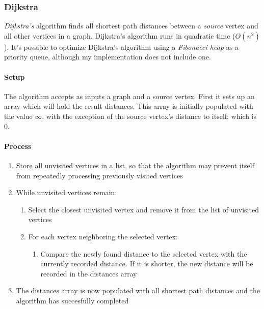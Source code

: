 \documentclass{article}
\begin{document}
\subsubsection{Dijkstra}
{\em Dijkstra's} algorithm finds all shortest path distances between a {\em source} vertex and all other vertices
in a graph. Dijkstra's algorithm runs in quadratic time (\(O(n^2)\)). It's possible to optimize Dijkstra's algorithm
using a {\em Fibonacci heap} as a priority queue, although my implementation does not include one.

\paragraph{Setup}
The algorithm accepts as inputs a graph and a source vertex. First it sets up an array which will hold the result
distances. This array is initially populated with the value \(\infty\), with the exception of the source vertex's
distance to itself; which is 0.

\paragraph{Process}
\begin{enumerate}
\item{Store all unvisited vertices in a list, so that the algorithm may prevent itself from repeatedly processing previously
    visited vertices}
\item{While unvisited vertices remain:}
  \begin{enumerate}
  \item{Select the closest unvisited vertex and remove it from the list of unvisited vertices}
  \item{For each vertex neighboring the selected vertex:}
    \begin{enumerate}
    \item{Compare the newly found distance to the selected vertex with the currently recorded distance. If it is shorter,
        the new distance will be recorded in the distances array}
    \end{enumerate}
  \end{enumerate}
\item{The distances array is now populated with all shortest path distances and the algorithm has succesfully completed}
\end{enumerate}

\end{document}
